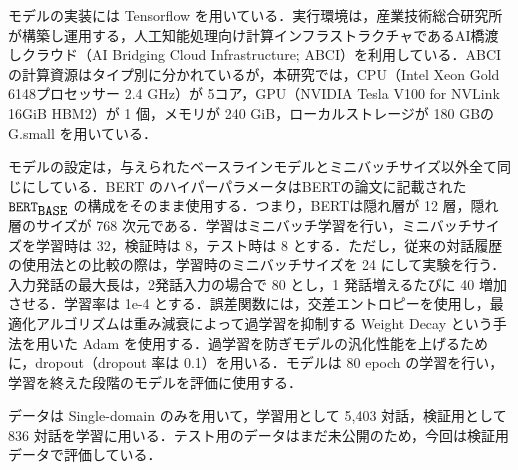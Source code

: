 モデルの実装には Tensorflow を用いている．実行環境は，産業技術総合研究所が構築し運用する，人工知能処理向け計算インフラストラクチャであるAI橋渡しクラウド（AI Bridging Cloud Infrastructure; ABCI）\cite{abci}を利用している．ABCIの計算資源はタイプ別に分かれているが，本研究では，CPU（Intel Xeon Gold 6148プロセッサー 2.4 GHz）が 5コア，GPU（NVIDIA Tesla V100 for NVLink 16GiB HBM2）が 1 個，メモリが 240 GiB，ローカルストレージが 180 GBの G.small を用いている．
\par
モデルの設定は，与えられたベースラインモデルとミニバッチサイズ以外全て同じにしている．BERT のハイパーパラメータはBERTの論文\cite{bert}に記載された $\verb|BERT|_{\verb|BASE|}$ の構成をそのまま使用する．つまり，BERTは隠れ層が 12 層，隠れ層のサイズが 768 次元である．学習はミニバッチ学習を行い，ミニバッチサイズを学習時は 32，検証時は 8，テスト時は 8 とする．ただし，従来の対話履歴の使用法との比較の際は，学習時のミニバッチサイズを 24 にして実験を行う．入力発話の最大長は，2発話入力の場合で 80 とし，1 発話増えるたびに 40 増加させる．学習率は 1e-4 とする．誤差関数には，交差エントロピーを使用し，最適化アルゴリズムは重み減衰によって過学習を抑制する Weight Decay という手法を用いた Adam \cite{adam} を使用する．過学習を防ぎモデルの汎化性能を上げるために，dropout（dropout 率は 0.1）を用いる．モデルは 80 epoch の学習を行い，学習を終えた段階のモデルを評価に使用する．
\par
データは Single-domain のみを用いて，学習用として 5,403 対話，検証用として 836 対話を学習に用いる．テスト用のデータはまだ未公開のため，今回は検証用データで評価している．
